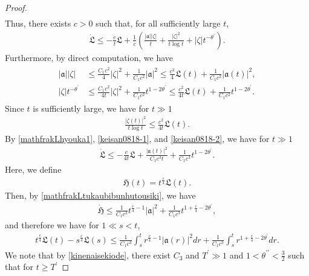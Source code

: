 \documentclass[reqno]{amsart}
\theoremstyle{plain}
\theoremstyle{definition}
\numberwithin{equation}{section}
\begin{document}
\begin{proof}
\begin{align*}
\end{align*}
Thus, there exists $c>0$ such that, for all sufficiently large $t$,
\begin{align}\label{mathfrakLhyouka1}
\dot{\mathfrak{L}}\leq -\frac{c}{t}\mathfrak{L}+\frac{1}{c}\left(\frac{|\mathfrak{a}||\zeta|}{t}+\frac{|\zeta|^2}{t\log{t}}+|\zeta|t^{-\theta^{\prime}}\right).
\end{align}
Furthermore, by direct computation, we have
\begin{align}\label{keisan0818-1}
\begin{aligned}
|\mathfrak{a}||\zeta|&\leq \frac{C_1c^2}{4}|\zeta|^2+\frac{1}{C_1c^2}|\mathfrak{a}|^2\leq \frac{c^2}{4}\mathfrak{L}(t)+\frac{1}{C_1c^2}|\mathfrak{a}(t)|^2,
\\
|\zeta|t^{-\theta^{\prime}}&\leq \frac{C_1c^2}{4t}|\zeta |^2+\frac{1}{C_1c^2}t^{1-2\theta^{\prime}}\leq \frac{c^2}{4t}\mathfrak{L}(t)+\frac{1}{C_1c^2}t^{1-2\theta^{\prime}}.
\end{aligned}
\end{align}
Since $t$ is sufficiently large, we have for $t\gg 1$
\begin{align}\label{keisan0818-2}
\frac{|\zeta(t)|^2}{t\log{t}}\leq \frac{c^2}{4t}\mathfrak{L}(t).
\end{align}
By \eqref{mathfrakLhyouka1}, \eqref{keisan0818-1}, and \eqref{keisan0818-2}, we have for $t\gg 1$
\begin{align}\label{mathfrakLtukaubibunhutousiki}
\dot{\mathfrak{L}}\leq -\frac{c}{4t}\mathfrak{L}+\frac{|\mathfrak{a}(t)|^2}{C_1c^3t}+\frac{1}{C_1c^3}t^{1-2\theta^{\prime}}.
\end{align}
Here, we define
\begin{align}\label{mathfrakHdef}
\mathfrak{H}(t)=t^{\frac{c}{4}}\mathfrak{L}(t).
\end{align}
Then, by \eqref{mathfrakLtukaubibunhutousiki}, we have
\begin{align*}
\dot{\mathfrak{H}}\leq \frac{1}{C_1c^3}t^{\frac{c}{4}-1}|\mathfrak{a}|^2+\frac{1}{C_1c^3}t^{1+\frac{c}{4}-2\theta^{\prime}},
\end{align*}
and therefore we have for $1\ll s<t$,
\begin{align}\label{mathfrakLnojunbi}
t^{\frac{c}{4}}\mathfrak{L}(t)-s^{\frac{c}{4}}\mathfrak{L}(s)\leq \frac{1}{C_1c^3}\int_s^t r^{\frac{c}{4}-1}|\mathfrak{a}(r)|^2dr+\frac{1}{C_1c^3}\int_s^t r^{1+\frac{c}{4}-2\theta^{\prime}}dr.
\end{align}
We note that by \eqref{kinenaisekiode}, there exist $C_3$ and $T^{\prime}\gg 1$ and $1<\theta^{\prime \prime}<\frac{3}{2}$ such that for $t\geq T^{\prime}$

\end{proof}
\end{document}
